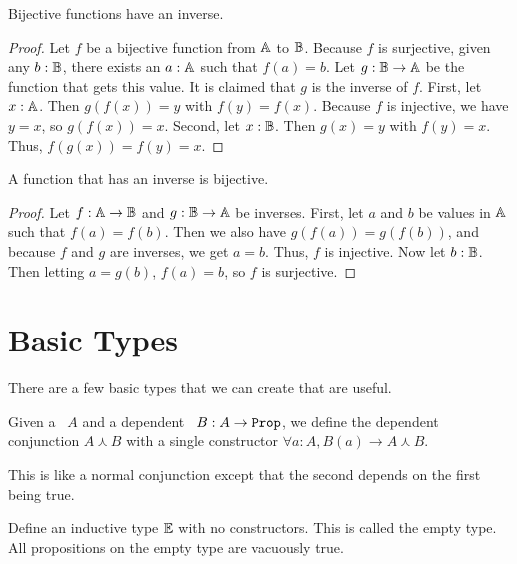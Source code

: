 \documentclass[../../math.tex]{subfiles}
\begin{document}
\begin{theorem} \label{bijective_inverse_ex}
    Bijective functions have an inverse.
\end{theorem}
\begin{proof}
    Let $f$ be a bijective function from $\mathbb{A}$ to $\mathbb{B}$.  Because $f$ is
    surjective, given any $b : \mathbb{B}$, there exists an $a : \mathbb{A}$ such that $f(a) =
    b$.  Let $g : \mathbb{B} \rightarrow \mathbb{A}$ be the function that gets this value.  It
    is claimed that $g$ is the inverse of $f$.  First, let $x : \mathbb{A}$.  Then
    $g(f(x)) = y$ with $f(y) = f(x)$.  Because $f$ is injective, we have $y =
    x$, so $g(f(x)) = x$.  Second, let $x : \mathbb{B}$.  Then $g(x) = y$ with $f(y) =
    x$.  Thus, $f(g(x)) = f(y) = x$.
\end{proof}

\begin{instance} \label{inverse_ex_bijective}
    A function that has an inverse is bijective.
\end{instance}
\begin{proof}
    Let $f : \mathbb{A} \rightarrow \mathbb{B}$ and $g : \mathbb{B} \rightarrow \mathbb{A}$ be inverses.  First,
    let $a$ and $b$ be values in $\mathbb{A}$ such that $f(a) = f(b)$.  Then we also
    have $g(f(a)) = g(f(b))$, and because $f$ and $g$ are inverses, we get $a =
    b$.  Thus, $f$ is injective.  Now let $b : \mathbb{B}$.  Then letting $a = g(b)$,
    $f(a) = b$, so $f$ is surjective.
\end{proof}

\section{Basic Types} \label{sec_types}

There are a few basic types that we can create that are useful.

\begin{definition}
    Given a \Prop\ $A$ and a dependent \Prop\ $B : A \rightarrow \Prop$, we
    define the dependent conjunction $A \curlywedge B$ with a single
    constructor $\forall a : A, B(a) \rightarrow A \curlywedge B$.
\end{definition}

This is like a normal conjunction except that the second \Prop depends on the
first \Prop being true.

\begin{definition}
    Define an inductive type $\mathbb{E}$ with no constructors.  This is called the
    empty type.  All propositions on the empty type are vacuously true.
\end{definition}
\end{document}

